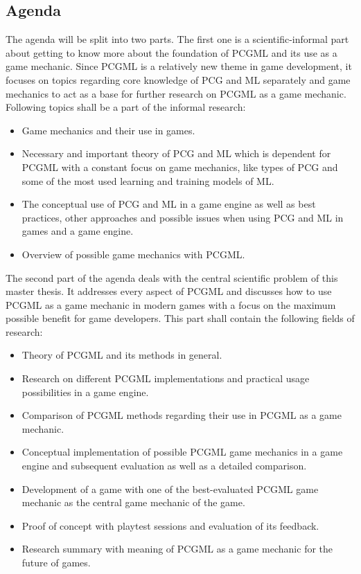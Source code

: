 \documentclass[MGS,Master,english]{twbook}%
\begin{document}
\subsection{Agenda}
The agenda will be split into two parts. The first one is a scientific-informal part about getting to know more about the foundation of \ac{PCGML} and its use as a game mechanic. Since \ac{PCGML} is a relatively new theme in game development, it focuses on topics regarding core knowledge of \ac{PCG} and \ac{ML} separately and game mechanics to act as a base for further research on \ac{PCGML} as a game mechanic. Following topics shall be a part of the informal research:
\begin{itemize}
	\item Game mechanics and their use in games.
	\item Necessary and important theory of PCG and ML which is dependent for PCGML with a constant focus on game mechanics, like types of PCG and some of the most used learning and training models of ML.
	\item The conceptual use of PCG and ML in a game engine as well as best practices, other approaches and possible issues when using PCG and ML in games and a game engine.
	\item Overview of possible game mechanics with \ac{PCGML}.
\end{itemize}
The second part of the agenda deals with the central scientific problem of this master thesis. It addresses every aspect of \ac{PCGML} and discusses how to use \ac{PCGML} as a game mechanic in modern games with a focus on the maximum possible benefit for game developers. This part shall contain the following fields of research: 
\begin{itemize}
	\item Theory of \ac{PCGML} and its methods in general.
	\item Research on different \ac{PCGML} implementations and practical usage possibilities in a game engine.
	\item Comparison of \ac{PCGML} methods regarding their use in \ac{PCGML} as a game mechanic.
	\item Conceptual implementation of possible \ac{PCGML} game mechanics in a game engine and subsequent evaluation as well as a detailed comparison.
	\item Development of a game with one of the best-evaluated \ac{PCGML} game mechanic as the central game mechanic of the game.
	\item Proof of concept with playtest sessions and evaluation of its feedback.
	\item Research summary with meaning of \ac{PCGML} as a game mechanic for the future of games. 
\end{itemize}
\end{document}
